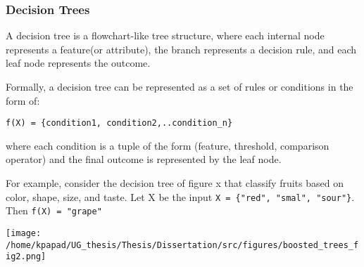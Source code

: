 \subsubsection{Decision Trees}
\label{sec:orgc68262f}
A decision tree is a flowchart-like tree structure, where each internal node represents a feature(or attribute), the branch represents a decision rule, and each leaf node represents the outcome.

Formally, a decision tree can be represented as a set of rules or conditions in the form of:

\texttt{f(X) = \{condition1, condition2,..condition\_n\}}

where each condition is a tuple of the form (feature, threshold, comparison operator) and the final outcome is represented by the leaf node.

For example, consider the decision tree of figure x that classify fruits based on color, shape, size, and taste. Let X be the input \texttt{X = \{"red", "smal", "sour"\}}. Then \texttt{f(X) = "grape"} 
\begin{center}
\texttt{[image: /home/kpapad/UG\_thesis/Thesis/Dissertation/src/figures/boosted\_trees\_fig2.png]}
\end{center} 

